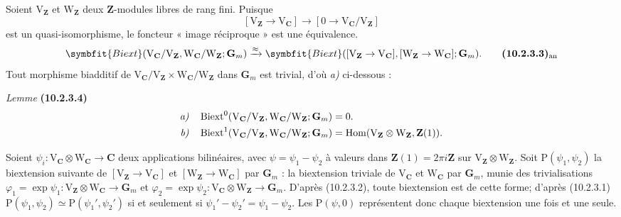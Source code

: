 \documentclass[11pt,leqno]{article}
\begin{document}
Soient \(\mathrm{V}_{\mathbf{Z}}\) et \(\mathrm{W}_{\mathbf{Z}}\) deux
\(\mathbf{Z}\)-modules libres de rang fini. Puisque
\[
[\mathrm{V}_{\mathbf{Z}}\to\mathrm{V}_{\mathbf{C}}]
\to[0\to\mathrm{V}_{\mathbf{C}}/\mathrm{V}_{\mathbf{Z}}]
\]
est un quasi-isomorphisme, le foncteur « image réciproque » est une
équivalence.
\[
\symbfit{Biext}(\mathrm{V}_{\mathbf{C}}/\mathrm{V}_{\mathbf{Z}},
\mathrm{W}_{\mathbf{C}}/\mathrm{W}_{\mathbf{Z}};\mathbf{G}_m)
\xrightarrow{\approx}
\symbfit{Biext}([\mathrm{V}_{\mathbf{Z}}\to\mathrm{V}_{\mathbf{C}}],
[\mathrm{W}_{\mathbf{Z}}\to\mathrm{W}_{\mathbf{C}}];\mathbf{G}_m).
\tag*{\textbf{(10.2.3.3)}\textsubscript{an}}
\]
Tout morphisme biadditif de
\(\mathrm{V}_{\mathbf{C}}/\mathrm{V}_{\mathbf{Z}}\times
\mathrm{W}_{\mathbf{C}}/\mathrm{W}_{\mathbf{Z}}\)
dans \(\mathbf{G}_m\) est trivial, d’où \textit{a)} ci-dessous :

\textit{Lemme} \textbf{(10.2.3.4)}
\[
\begin{aligned}
\text{\textit{a)}}\quad&
\operatorname{Biext}^{0}(\mathrm{V}_{\mathbf{C}}/\mathrm{V}_{\mathbf{Z}},
\mathrm{W}_{\mathbf{C}}/\mathrm{W}_{\mathbf{Z}};\mathbf{G}_m)=0.\\
\text{\textit{b)}}\quad&
\operatorname{Biext}^{1}(\mathrm{V}_{\mathbf{C}}/\mathrm{V}_{\mathbf{Z}},
\mathrm{W}_{\mathbf{C}}/\mathrm{W}_{\mathbf{Z}};\mathbf{G}_m)
=\operatorname{Hom}(\mathrm{V}_{\mathbf{Z}}\otimes
\mathrm{W}_{\mathbf{Z}},\mathbf{Z}(1)).
\end{aligned}
\]

Soient \(\psi_i:\mathrm{V}_{\mathbf{C}}\otimes
\mathrm{W}_{\mathbf{C}}\to\mathbf{C}\) deux applications bilinéaires,
avec \(\psi=\psi_1-\psi_2\) à valeurs dans
\(\mathbf{Z}(1)=2\pi i\mathbf{Z}\) sur
\(\mathrm{V}_{\mathbf{Z}}\otimes\mathrm{W}_{\mathbf{Z}}\).
Soit \(\mathrm{P}(\psi_1,\psi_2)\) la biextension suivante de
\([\mathrm{V}_{\mathbf{Z}}\to\mathrm{V}_{\mathbf{C}}]\) et
\([\mathrm{W}_{\mathbf{Z}}\to\mathrm{W}_{\mathbf{C}}]\) par
\(\mathbf{G}_m\) : la biextension triviale de
\(\mathrm{V}_{\mathbf{C}}\) et \(\mathrm{W}_{\mathbf{C}}\) par
\(\mathbf{G}_m\), munie des trivialisations
\(\varphi_1=\exp\psi_1:\mathrm{V}_{\mathbf{Z}}\otimes
\mathrm{W}_{\mathbf{C}}\to\mathbf{G}_m\) et
\(\varphi_2=\exp\psi_2:\mathrm{V}_{\mathbf{C}}\otimes
\mathrm{W}_{\mathbf{Z}}\to\mathbf{G}_m\).
D’après (10.2.3.2), toute biextension est de cette forme; d’après
(10.2.3.1)
\(\mathrm{P}(\psi_1,\psi_2)\simeq\mathrm{P}(\psi_1',\psi_2')\)
si et seulement si \(\psi_1'-\psi_2'=\psi_1-\psi_2\).
Les \(\mathrm{P}(\psi,0)\) représentent donc chaque biextension une
fois et une seule.
\end{document}
